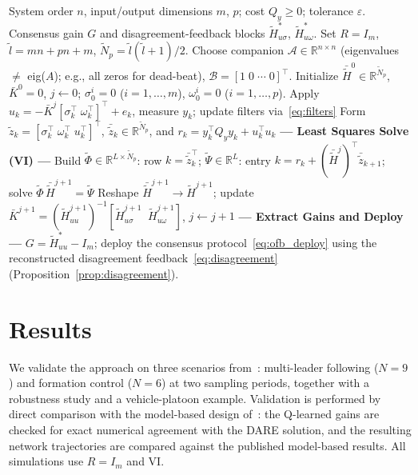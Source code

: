 \documentclass[12pt]{elsarticle}
\theoremstyle{remark}
\newcommand{\R}{\mathbb{R}}
\begin{document}
\begin{algorithm}[!htb]
\caption{Output Feedback Q-Learning for Consensus Gains}
\label{alg:ofb_ql}
\begin{algorithmic}[1]
\REQUIRE System order $n$, input/output dimensions $m$, $p$; cost $Q_y \geq 0$; tolerance $\varepsilon$.
\ENSURE Consensus gain $G$ and disagreement-feedback blocks $\tilde{H}_{u\sigma}^*$, $\tilde{H}_{u\omega}^*$.
\STATE Set $R = I_m$, $\tilde{l} = mn + pn + m$, $\tilde{N}_p = \tilde{l}(\tilde{l}+1)/2$.
\STATE Choose companion $\mathcal{A} \in \R^{n \times n}$ (eigenvalues $\neq$ eig($A$); e.g., all zeros for dead-beat), $\mathcal{B} = [1 \; 0 \; \cdots \; 0]^\top$.
\STATE Initialize $\bar{\tilde{H}}^0 \in \R^{\tilde{N}_p}$, $\bar{K}^0 = 0$, $j \leftarrow 0$; $\sigma_0^i = 0$ ($i=1,\ldots,m$), $\omega_0^i = 0$ ($i=1,\ldots,p$).
    \STATE Apply $u_k = -\bar{K}^j [\sigma_k^\top \; \omega_k^\top]^\top + e_k$, measure $y_k$; update filters via~\eqref{eq:filters}
    \STATE Form $\tilde{z}_k = [\sigma_k^\top \; \omega_k^\top \; u_k^\top]^\top$, $\bar{\tilde{z}}_k \in \R^{\tilde{N}_p}$, and $r_k = y_k^\top Q_y y_k + u_k^\top u_k$
\ENDFOR
\REPEAT
    \STATE \textbf{--- Least Squares Solve (VI) ---}
    \STATE Build $\tilde{\Phi} \in \R^{L \times \tilde{N}_p}$: row $k = \bar{\tilde{z}}_k^\top$; \; $\tilde{\Psi} \in \R^L$: entry $k = r_k + (\bar{\tilde{H}}^j)^\top \bar{\tilde{z}}_{k+1}$; \; solve $\tilde{\Phi} \, \bar{\tilde{H}}^{j+1} = \tilde{\Psi}$
    \STATE Reshape $\bar{\tilde{H}}^{j+1} \to \tilde{H}^{j+1}$; update $\bar{K}^{j+1} = (\tilde{H}_{uu}^{j+1})^{-1} [\tilde{H}_{u\sigma}^{j+1} \;\; \tilde{H}_{u\omega}^{j+1}]$, \; $j \leftarrow j + 1$
\STATE \textbf{--- Extract Gains and Deploy ---}
\STATE $G = \tilde{H}_{uu}^* - I_m$; deploy the consensus protocol~\eqref{eq:ofb_deploy} using the reconstructed disagreement feedback~\eqref{eq:disagreement} (Proposition~\ref{prop:disagreement}).
\end{algorithmic}
\end{algorithm}

\section{Results}
\label{sec:results}

We validate the approach on three scenarios from~\cite{cacace2024}: multi-leader following ($N{=}9$) and formation control ($N{=}6$) at two sampling periods, together with a robustness study and a vehicle-platoon example. Validation is performed by direct comparison with the model-based design of~\cite{cacace2024}: the Q-learned gains are checked for exact numerical agreement with the DARE solution, and the resulting network trajectories are compared against the published model-based results. All simulations use $R = I_m$ and VI.
\end{document}
